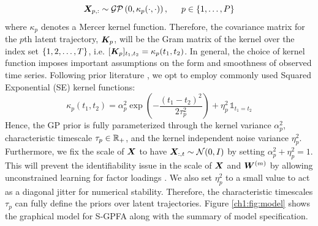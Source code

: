 \begin{equation}
    \bm{X}_{p, :} \sim \mathcal{GP}\left(0, \kappa_p(\cdot , \cdot) \right), \hspace{1.5em} p \in \{1, \ldots, P\}
\end{equation}
where $\kappa_p$ denotes a Mercer kernel function. Therefore, the covariance matrix for the $p$th latent trajectory, $\bm{K}_p$, will be the Gram matrix of the kernel over the index set $\{1, 2, \ldots, T\}$, i.e. $[\bm{K}_p]_{t_1,t_2} = \kappa_p(t_1, t_2)$. In general, the choice of kernel function imposes important assumptions on the form and smoothness of observed time series. Following prior literature \cite{infraslow,lfgp}, we opt to employ commonly used Squared Exponential (SE) kernel functions:
\begin{equation}
    \kappa_p (t_1, t_2) = \alpha_p^2 \exp \left( -\frac{(t_1 - t_2)^2}{2\tau_p^2} \right) + \eta_p^2 \, \mathds{1}_{t_1=t_2}
\end{equation}
Hence, the GP prior is fully parameterized through the kernel variance $\alpha_p^2$, characteristic timescale $\tau_p \in \mathbb{R}_+$, and the kernel independent noise variance $\eta_p^2$. Furthermore, we fix the scale of $\bm{X}$ to have $\bm{X}_{:,t} \sim \mathcal{N}(0, I)$ by setting $\alpha_p^2 + \eta_p^2 = 1$. This will prevent the identifiability issue in the scale of $\bm{X}$ and $\bm{W}^{(m)}$ by allowing unconstrained learning for factor loadings \cite{gpfa, infraslow, lfgp}. We also set $\eta_p^2$ to a small value to act as a diagonal jitter for numerical stability. Therefore, the characteristic timescales $\tau_p$ can fully define the priors over latent trajectories. Figure \ref{ch1:fig:model} shows the graphical model for S-GPFA along with the summary of model specification.


